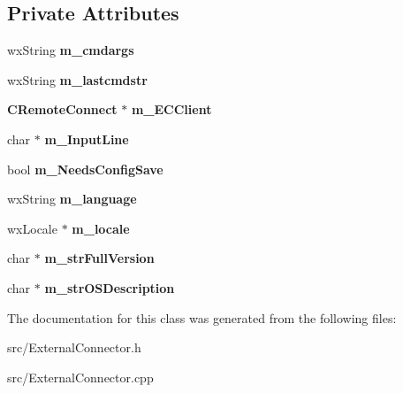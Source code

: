 \subsection*{Private Attributes}
\begin{DoxyCompactItemize}
\item 
wxString {\bfseries m\_\-cmdargs}\label{classCaMuleExternalConnector_ad7a2ec202c067cb697715da28706bbae}

\item 
wxString {\bfseries m\_\-lastcmdstr}\label{classCaMuleExternalConnector_ab8fc6e8ba79a95deb6c5d03708d7f062}

\item 
{\bf CRemoteConnect} $\ast$ {\bfseries m\_\-ECClient}\label{classCaMuleExternalConnector_a423589561446c7be28ce7528236da313}

\item 
char $\ast$ {\bfseries m\_\-InputLine}\label{classCaMuleExternalConnector_aa52d32ce1bbf55b655d4043d6665db32}

\item 
bool {\bfseries m\_\-NeedsConfigSave}\label{classCaMuleExternalConnector_adabfde9b5f181f33a1d1845a85032eb6}

\item 
wxString {\bfseries m\_\-language}\label{classCaMuleExternalConnector_a73fd009243c2827ab8ec587ba07d01cc}

\item 
wxLocale $\ast$ {\bfseries m\_\-locale}\label{classCaMuleExternalConnector_a737cf4e2e8abe92441d67b33eaaf950e}

\item 
char $\ast$ {\bfseries m\_\-strFullVersion}\label{classCaMuleExternalConnector_a87ae102e094d9e8639052c944590d275}

\item 
char $\ast$ {\bfseries m\_\-strOSDescription}\label{classCaMuleExternalConnector_a1d7e52c54b2638f36f5e8041bf2e2145}

\end{DoxyCompactItemize}


The documentation for this class was generated from the following files:\begin{DoxyCompactItemize}
\item 
src/ExternalConnector.h\item 
src/ExternalConnector.cpp\end{DoxyCompactItemize}
